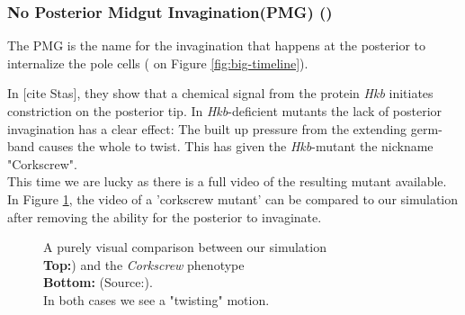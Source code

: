 \subsubsection{No Posterior Midgut Invagination(PMG) ()}
The PMG is the name for the invagination that happens at the posterior to internalize the pole cells ( on Figure \ref{fig:big-timeline}).

In [cite Stas], they show that a chemical signal from the protein \textit{Hkb} initiates constriction on the posterior tip. In \textit{Hkb}-deficient mutants the lack of posterior invagination has a clear effect: The built up pressure from the extending germ-band causes the whole to twist. This has given the \textit{Hkb}-mutant the nickname "Corkscrew".\\

This time we are lucky as there is a full video of the resulting mutant available. In Figure \ref{fig:corkscrew-comparison}, the video of a 'corkscrew mutant' can be compared to our simulation after removing the ability for the posterior to invaginate.

 
\begin{figure}[H]
    \centering
    \caption{A purely visual comparison between our simulation \\
    \textbf{Top:}) and the \textit{Corkscrew} phenotype \\
    \textbf{Bottom:}   (Source:).\\ In both cases we see a "twisting" motion.}
    \label{fig:corkscrew-comparison}
\end{figure}

